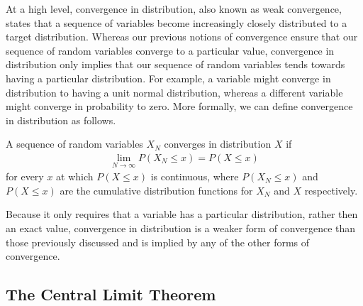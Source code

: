 At a  high level, convergence in distribution, also known as weak convergence, states that a sequence of variables become
increasingly closely distributed to a target distribution.  Whereas our previous notions of
convergence ensure that our sequence of random variables converge to a particular value, 
convergence in distribution only implies that our sequence of random variables tends towards
having a particular distribution.  For example, a variable might converge in distribution to
having a unit normal distribution, whereas a different variable might converge in probability
to zero. More formally, we can define convergence in distribution as follows.
\begin{definition}
	A sequence of random variables $X_N$ converges in distribution $X$  if
	\begin{align}
		\lim\limits_{N\rightarrow\infty} P(X_N \le x) = P(X \le x)
	\end{align}
	for every $x$ at which $P(X\le x)$ is continuous, where $P(X_N \le x) $ and $P(X \le x)$
	are the cumulative distribution functions for $X_N$ and $X$ respectively.
\end{definition}
\noindent Because it only requires that a variable has a particular distribution, rather then an
 exact value, convergence in distribution is a weaker form of convergence than those previously
 discussed and is implied by any of the other forms of convergence.  
\vspace{5pt}

\subsection{The Central Limit Theorem}
\label{sec:inf:mc:clt}

